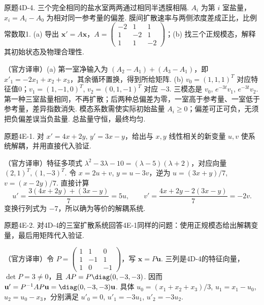 \begin{exercise}\label{cw:bank-4D-4}原题4D-4. 三个完全相同的盐水室两两通过相同半透膜相隔. $A_i$ 为第 $i$ 室盐量，$x_i=A_i-A_0$ 为相对同一参考量的偏差. 膜间扩散速率与两侧浓度差成正比，比例常数取1. (a) 导出 $\mathbf x'=A\mathbf x$，$A=\begin{pmatrix}-2&1&1\\1&-2&1\\1&1&-2\end{pmatrix}$；(b) 找三个正规模态，解释其初始状态及物理合理性.\end{exercise}
\begin{solution}（官方译审）(a) 第一室净输入为 $(A_2-A_1)+(A_3-A_1)$，即 $x'_1=-2x_1+x_2+x_3$，其余循环置换，得到所给矩阵. (b) $v_0=(1,1,1)^T$ 对应特征值0；$v_1=(1,-1,0)^T$, $v_2=(0,1,-1)^T$ 对应 $-3$. 三模态是 $v_0$, $e^{-3t}v_1$, $e^{-3t}v_2$. 第一种三室盐量相同，不再扩散；后两种总偏差为零，一室高于参考量、一室低于参考量，差异指数消失. 模态系数需使实际初始盐量 $A_i\ge0$；偏差可正可负，无须把负偏差误当负盐量. 总盐量守恒，最终均匀.\end{solution}
\begin{exercise}\label{cw:bank-4E-1}原题4E-1. 对 $x'=4x+2y$, $y'=3x-y$，给出与 $x,y$ 线性相关的新变量 $u,v$ 使系统解耦，并用直接代入验证.\end{exercise}
\begin{solution}（官方译审）特征多项式 $\lambda^2-3\lambda-10=(\lambda-5)(\lambda+2)$，对应向量 $(2,1)^T,(1,-3)^T$. 令 $x=2u+v$, $y=u-3v$，逆为 $u=(3x+y)/7$, $v=(x-2y)/7$. 直接计算
\[u'=\frac{3(4x+2y)+(3x-y)}7=5u,\qquad
v'=\frac{4x+2y-2(3x-y)}7=-2v.\]
变换行列式为 $-7$，所以确为等价的解耦系统.\end{solution}
\begin{exercise}\label{cw:bank-4E-2}原题4E-2. 对4D-4的三室扩散系统回答4E-1同样的问题：使用正规模态给出解耦变量，最后用矩阵代入验证.\end{exercise}
\begin{solution}（官方译审）令 $P=\begin{pmatrix}1&1&0\\1&-1&1\\1&0&-1\end{pmatrix}$，写 $\mathbf x=P\mathbf u$. 三列是4D-4的特征向量，$\det P=3\ne0$，且 $AP=P\diag(0,-3,-3)$. 因而 $\mathbf u'=P^{-1}AP\mathbf u=\diag(0,-3,-3)\mathbf u$. 具体 $u_0=(x_1+x_2+x_3)/3$, $u_1=x_1-u_0$, $u_2=u_0-x_3$，分别满足 $u'_0=0$, $u'_1=-3u_1$, $u'_2=-3u_2$.\end{solution}
